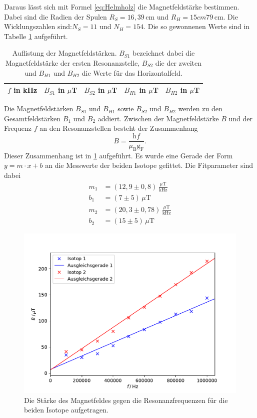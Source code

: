 Daraus lässt sich mit Formel \ref{eq:Helmholz} die Magnetfeldstärke bestimmen.
Dabei sind die Radien der Spulen $R_{S}=16,39$\,cm und $R_H=15cm79$\,cm.
Die Wicklungszahlen sind:$N_{S}=11$ und $N_H=154$. Die
so gewonnenen Werte sind in Tabelle \ref{tab:Magnetwerte} aufgeführt.
\begin{table}[H]
    \centering
    \caption{Auflistung der Magnetfeldstärken. $B_{S1}$ bezeichnet dabei die Magnetfeldstärke der
    ersten Resonanzstelle, $B_{S2}$ die der zweiten und $B_{H1}$ und $B_{H2}$ die Werte für das Horizontalfeld.}
    \label{tab:Magnetwerte}
    \begin{tabular}{c|c|c|c|c}
        \toprule
        $f$ in kHz & $B_{S1}$ in $\mu$T & $B_{S2}$ in $\mu$T& $B_{H1}$ in $\mu$T& $B_{H2}$ in $\mu$T\\
        \midrule
        
        \bottomrule
    \end{tabular}
\end{table}
Die Magnetfeldstärken $B_{S1}$ und $B_{H1}$ sowie $B_{S2}$ und $B_{H2}$ werden zu den Gesamtfeldstärken
$B_1$ und $B_2$ addiert.
Zwischen der Magnetfeldstärke $B$ und der Frequenz $f$ an den Resonanzstellen besteht der Zusammenhang
\begin{equation}
  B=\frac{\text{h}f}{\mu_{\text{B}} \text{g}_{\text{F}}} .
\end{equation}
Dieser Zusammenhang ist in \ref{fig:BFelder} aufgeführt. Es wurde eine Gerade der
Form $y=m\cdot x+b$ an die Messwerte der beiden Isotope gefittet. Die Fitparameter sind dabei
\begin{align*}
  m_1&=(12,9 \pm 0,8)\,\frac{\mu\text{T}}{\text{kHz}} \\
  b_1&=(7 \pm 5)\,\mu\text{T}\\
  m_2&=(20,3 \pm 0,78)\,\frac{\mu\text{T}}{\text{kHz}} \\
  b_2&=(15 \pm 5)\,\mu\text{T}
\end{align*}
\begin{figure}
  \centering
  \includegraphics{plots/neuBFelder.pdf}
  \caption{Die Stärke des Magnetfeldes gegen die Resonanzfrequenzen für die beiden Isotope
  aufgetragen.}
  \label{fig:BFelder}
\end{figure}
